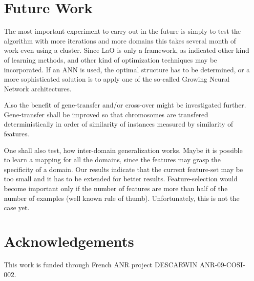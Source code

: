 \documentclass{acm_proc_article-sp}
\begin{document}
\section{Future Work}
\label{section:futurework}	

The most important experiment to carry out in the future is simply to test the algorithm with more iterations and more domains this takes several month of work even using a cluster. Since LaO is only a framework, as indicated other kind of learning methods, and other kind of optimization techniques may be incorporated. If an ANN is used, the optimal structure has to be determined, or a more sophisticated solution is to apply one of the so-called Growing Neural Network architectures.

Also the benefit of gene-transfer and/or cross-over might be investigated further. Gene-transfer shall be improved so that chromosomes are transfered deterministically in order of similarity of instances measured by similarity of features.

One shall also test, how inter-domain generalization works. Maybe it is possible to learn a mapping for all the domains, since the features may grasp the specificity of a domain. Our results indicate that the current feature-set may be too small and it has to be extended for better results. Feature-selection would become important only if the number of features are more than half of the number of examples (well known rule of thumb). Unfortunately, this is not the case yet.


\section{Acknowledgements}
This work is funded through French ANR project DESCARWIN ANR-09-COSI-002.




\end{document}
